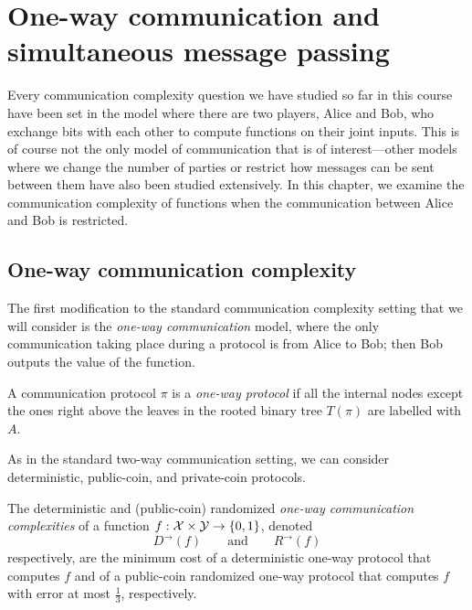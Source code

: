 \chapter[CH06]{ One-way communication and simultaneous message passing}


Every communication complexity question we have studied so far in this course have been set in the model where there are two players, Alice and Bob, who exchange bits with each other to compute functions on their joint inputs. This is of course not the only model of communication that is of interest---other models where we change the number of parties or restrict how messages can be sent between them have also been studied extensively. In this chapter, we examine the communication complexity of functions when the communication between Alice and Bob is restricted.

\newpage


\section{One-way communication complexity}

The first modification to the standard communication complexity setting that we will consider is the \emph{one-way communication} model, where the only communication taking place during a protocol is from Alice to Bob; then Bob outputs the value of the function.

\begin{definition}
	A communication protocol $\pi$ is a \emph{one-way protocol} if all the internal nodes except the ones right above the leaves in the rooted binary tree $T(\pi)$ are labelled with $A$.
\end{definition}

As in the standard two-way communication setting, we can consider deterministic, public-coin, and private-coin protocols.

\begin{definition}
	The deterministic and (public-coin) randomized \emph{one-way communication complexities} of a function $f : \mathcal{X} \times \mathcal{Y} \to \{0,1\}$, denoted
	\[
	D^{\rightarrow}(f) \qquad \mbox{and} \qquad R^{\rightarrow}(f)
	\]
	respectively, are the minimum cost of a deterministic one-way protocol that computes $f$ and of a public-coin randomized one-way protocol that computes $f$ with error at most $\frac13$, respectively.
\end{definition}

